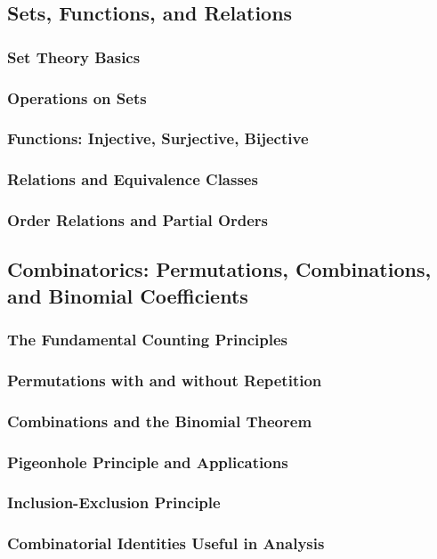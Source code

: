 \subsection{Sets, Functions, and Relations}
\subsubsection{Set Theory Basics}
\subsubsection{Operations on Sets}
\subsubsection{Functions: Injective, Surjective, Bijective}
\subsubsection{Relations and Equivalence Classes}
\subsubsection{Order Relations and Partial Orders}

\subsection{Combinatorics: Permutations, Combinations, and Binomial Coefficients}
\subsubsection{The Fundamental Counting Principles}
\subsubsection{Permutations with and without Repetition}
\subsubsection{Combinations and the Binomial Theorem}
\subsubsection{Pigeonhole Principle and Applications}
\subsubsection{Inclusion-Exclusion Principle}
\subsubsection{Combinatorial Identities Useful in Analysis}

